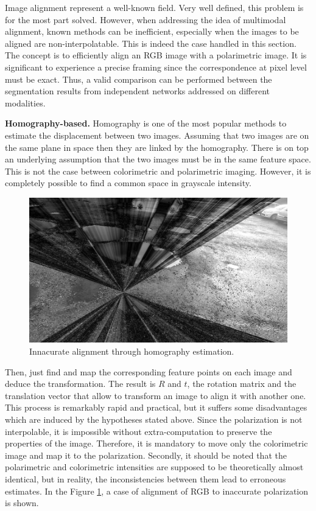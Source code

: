 Image alignment represent a well-known field. Very well defined, this problem is for the most part solved. However, when addressing the idea of multimodal alignment, known methods can be inefficient, especially when the images to be aligned are non-interpolatable.
This is indeed the case handled in this section. The concept is to efficiently align an RGB image with a polarimetric image. It is significant to experience a precise framing since the correspondence at pixel level must be exact. Thus, a valid comparison can be performed between the segmentation results from independent networks addressed on different modalities.

\textbf{Homography-based.} Homography \cite{artin1957geometric,baer2005linear} is one of the most popular methods to estimate the displacement between two images. Assuming that two images are on the same plane in space then they are linked by the homography. 
There is on top an underlying assumption that the two images must be in the same feature space. This is not the case between colorimetric and polarimetric imaging. However, it is completely possible to find a common space in grayscale intensity.
\begin{figure}[h]
	\centering
	\includegraphics[width=0.8\linewidth]{Figures/Dataset/VISWarp}
	\caption{Innacurate alignment through homography estimation.}
	\label{fig:viswarp}
\end{figure}
Then, just find and map the corresponding feature points on each image and deduce the transformation. The result is $R$ and $t$, the rotation matrix and the translation vector that allow to transform an image to align it with another one. 
This process is remarkably rapid and practical, but it suffers some disadvantages which are induced by the hypotheses stated above. Since the polarization is not interpolable, it is impossible without extra-computation to preserve the properties of the image. Therefore, it is mandatory to move only the colorimetric image and map it to the polarization. Secondly, it should be noted that the polarimetric and colorimetric intensities are supposed to be theoretically almost identical, but in reality, the inconsistencies between them lead to erroneous estimates. In the Figure \ref{fig:viswarp}, a case of alignment of RGB to inaccurate polarization is shown. 




